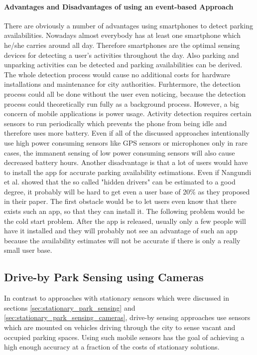 \paragraph{Advantages and Disadvantages of using an event-based Approach}

There are obviously a number of advantages using smartphones to detect parking availabilities. Nowadays almost everybody has at least one smartphone which he/she carries around all day. Therefore smartphones are the optimal sensing devices for detecting a user's activities throughout the day. Also parking and unparking activities can be detected and parking availabilities can be derived. The whole detection process would cause no additional costs for hardware installations and maintenance for city authorities. Furhtermore, the detection process could all be done without the user even noticing, because the detection process could theoretically run fully as a background process. However, a big concern of mobile applications is power usage. Activity detection requires certain sensors to run periodically which prevents the phone from being idle and therefore uses more battery. Even if all of the discussed approaches intentionally use high power consuming sensors like GPS sensors or microphones only in rare cases, the immanent sensing of low power consuming sensors will also cause decreased battery hours. Another disadvantage is that a lot of users would have to install the app for accurate parking availability estimations. Even if Nangundi et al. \cite{Nandugudi:2014:PPP:2632048.2632098} showed that the so called "hidden drivers" can be estimated to a good degree, it probably will be hard to get even a user base of 20\% as they proposed in their paper. The first obstacle would be to let users even know that there exists such an app, so that they can install it. The following problem would be the cold start problem. After the app is released, usually only a few people will have it installed and they will probably not see an advantage of such an app because the availability estimates will not be accurate if there is only a really small user base. 






\subsection{Drive-by Park Sensing using Cameras}
\label{sec:related_driveby_park_sensing_cameras}
 
In contrast to approaches with stationary sensors which were discussed in sections \ref{sec:stationary_park_sensing} and \ref{sec:stationary_park_sensing_cameras}, drive-by sensing approaches use sensors which are mounted on vehicles driving through the city to sense vacant and occupied parking spaces. Using such mobile sensors has the goal of achieving a high enough accuracy at a fraction of the costs of stationary solutions.

